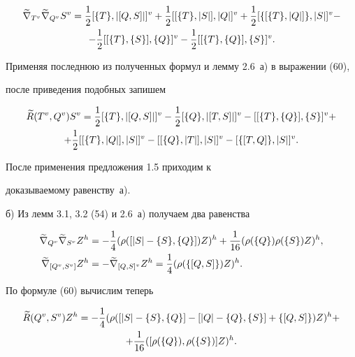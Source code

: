 \begin{pf}
\begin{multline*}
\grn{\gv{T}}{\grn{\gv{Q}}{\gv{S}}}=\1\gv{[\{T\},|[Q,S]|]}+\1


\gv{[[\{T\},|S|],|Q|]}+\1\gv{[\{[\{T\},|Q|]\},|S|]}-\\


-\1\gv{[[\{T\},\{S\}],\{Q\}]}-\1\gv{[[\{T\},\{Q\}],\{S\}]}.


\end{multline*}


Применяя последнюю из полученных формул и лемму 2.6~а) в выражении (60),


после приведения подобных запишем


\begin{multline*}


\g{R}(\gv{T},\gv{Q})\gv{S}=\1\gv{[\{T\},|[Q,S]|]}-\1\gv{[\{Q\},|[T,S]|]}-


\gv{[[\{T\},\{Q\}],\{S\}]}+\\


+\1\gv{[[\{T\},|Q|],|S|]}-\gv{[[\{Q\},|T|],|S|]}-\gv{[\{[T,Q]\},|S|]}.


\end{multline*}


После применения предложения 1.5 приходим к


доказываемому равенству~а).





б) Из лемм 3.1, 3.2 (54) и 2.6~а) получаем два равенства


\begin{align*}


\grn{\gv{Q}}{\grn{\gv{S}}{\gh{Z}}}&=-\4\gh{(\rho([|S|-\{ S\},\{ Q\}


])Z)}+\6\gh{(\rho(\{Q\})\rho(\{S\})Z)},\\


\grn{[\gv{Q},\gv{S}]}{\gh{Z}}&=-\grn{[Q,S]^v}{\gh{Z}}=


\4\gh{(\rho(\{[Q,S]\})Z)}.


\end{align*}


По формуле (60) вычислим теперь


\begin{multline*}


\g{R}(\gv{Q},\gv{S})\gh{Z}=-\4\gh{(\rho([|S|-\{S\},\{Q\}]-[|Q|-


\{Q\},\{S\}]+\{[Q,S]\})Z)}+\\


+\6\gh{([\rho(\{Q\}),\rho(\{S\})]Z)}.


\end{multline*}



\end{pf}
